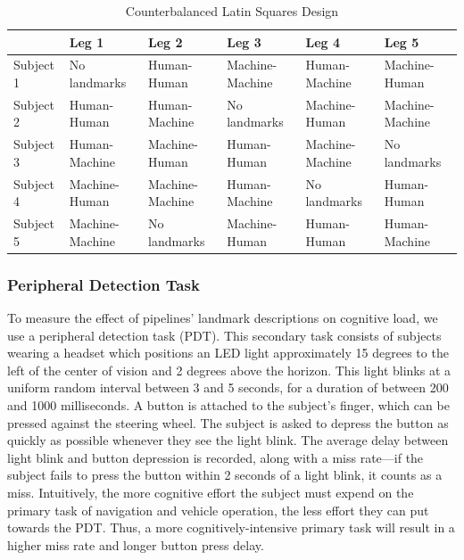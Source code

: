 \begin{table}[htbp]
  \centering
  \caption{Counterbalanced Latin Squares Design}
  \label{tab:latinsquares}
  {\tabulinesep=2mm
    \begin{singlespace}
    \begin{tabu} to \textwidth{|X[c]||X[c]|X[c]|X[c]|X[c]|X[c]|}
        \hline
        & Leg 1 & Leg 2 & Leg 3 & Leg 4 & Leg 5 \\
        \hline\hline
        Subject 1 & No landmarks    & Human-Human     & Machine-Machine & Human-Machine   & Machine-Human   \\
                \hline
        Subject 2 & Human-Human     & Human-Machine   & No landmarks    & Machine-Human   & Machine-Machine \\
                \hline
        Subject 3 & Human-Machine   & Machine-Human   & Human-Human     & Machine-Machine & No landmarks    \\
                \hline
        Subject 4 & Machine-Human   & Machine-Machine & Human-Machine   & No landmarks    & Human-Human     \\
                \hline
        Subject 5 & Machine-Machine & No landmarks    & Machine-Human   & Human-Human     & Human-Machine   \\
    \hline
    \end{tabu}
    \end{singlespace}
    }
\end{table}

\subsubsection{Peripheral Detection Task}

To measure the effect of pipelines' landmark descriptions on cognitive load, we use a peripheral detection task (PDT). This secondary task consists of subjects wearing a headset which positions an LED light approximately 15 degrees to the left of the center of vision and 2 degrees above the horizon. This light blinks at a uniform random interval between 3 and 5 seconds, for a duration of between 200 and 1000 milliseconds. A button is attached to the subject's finger, which can be pressed against the steering wheel. The subject is asked to depress the button as quickly as possible whenever they see the light blink. The average delay between light blink and button depression is recorded, along with a miss rate---if the subject fails to press the button within 2 seconds of a light blink, it counts as a miss. Intuitively, the more cognitive effort the subject must expend on the primary task of navigation and vehicle operation, the less effort they can put towards the PDT. Thus, a more cognitively-intensive primary task will result in a higher miss rate and longer button press delay.

